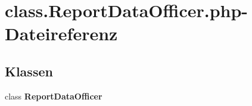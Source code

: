 \section{class.ReportDataOfficer.php-Dateireferenz}
\label{class_8ReportDataOfficer_8php}
\subsection*{Klassen}
\begin{CompactItemize}
\item 
class {\bf ReportDataOfficer}
\end{CompactItemize}
